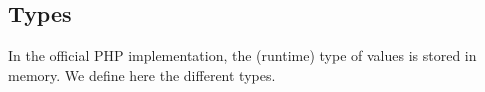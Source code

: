 \documentclass{article}
\begin{document}
\begin{kdefinition}
\begin{module}{}
\begin{syntaxBlock}{}
\end{syntaxBlock}

\begin{syntaxBlock}{}
\end{syntaxBlock}

\begin{syntaxBlock}{}
\end{syntaxBlock}

\begin{syntaxBlock}{}
\end{syntaxBlock}

\begin{syntaxBlock}{}
\end{syntaxBlock}

\begin{syntaxBlock}{}
\end{syntaxBlock}

\begin{syntaxBlock}{}
\end{syntaxBlock}

\begin{syntaxBlock}{}
\end{syntaxBlock}
\begin{kblock}[text]
 \subsection{Types} 
		In the official PHP implementation, the (runtime) type of values is stored in memory. 
		We define here the different types. \end{kblock}


\end{module}
\end{kdefinition}
\end{document}
